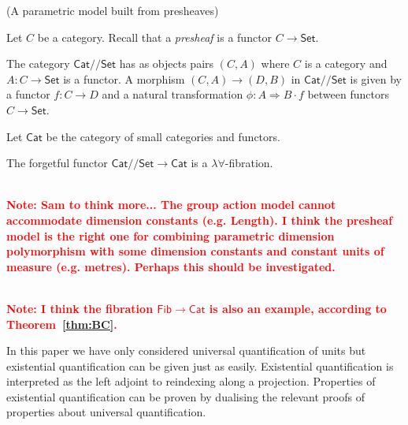 \documentclass[a4paper,UKenglish]{lipics}
\newcommand\note[1]{{ \bf \textcolor{red} {\vspace{2mm}\; \\ Note: #1\\}}}
\newcommand{\ra}{\rightarrow}
\newcommand{\msf}[1]{\mathsf{#1}} %
\newcommand{\Set}{\msf{Set}}
\newcommand{\Cat}{\msf{Cat}}
\newcommand{\Fib}{\msf{Fib}}
\newcommand{\LAb}{\msf{L}_{\msf{Ab}}}
\newcommand{\terminal}{\msf{1}}
\newcommand{\E}{\mathcal{E}}
\newcommand{\fibreE}[1]{\E_{_{#1}}}
\newcommand{\GroupSet}[1]{#1/\!/\Set}
\newcommand{\CatSet}{\GroupSet{\Cat}}
\newcommand{\qnt}{\msf{quantity}}
\begin{document}
\begin{example}(A parametric model built from presheaves)

Let $C$ be a category. Recall that a \emph{presheaf} is a
functor $C\to\Set$.

The category $\CatSet$ has as objects pairs $(C,A)$ where $C$ is a
category and $A:C\to\Set$ is a functor. A morphism $(C,A) \rightarrow
(D,B)$ in $\CatSet$ is given by a functor $f:C\rightarrow D$
and a natural transformation $\phi:A \Rightarrow B\cdot f$ between functors
$C\to\Set$.


Let $\Cat$ be the category of small categories and functors.

The forgetful functor $\CatSet\to \Cat$ is a $\lambda\forall$-fibration.


\note{Sam to think more... The group action model cannot accommodate dimension constants (e.g. Length). I think the presheaf model is the right one for combining parametric dimension polymorphism with
some dimension constants and constant units of measure (e.g. metres).
Perhaps this should be investigated.}

\end{example}
\note{I think the fibration $\Fib\to\Cat$ is also an example,
according to Theorem~\ref{thm:BC}. }



\begin{remark}
In this paper we have only considered universal quantification of units but existential quantification can be given just as easily. Existential quantification is interpreted as the left adjoint to reindexing along a projection. Properties of  existential quantification can be proven by dualising the relevant proofs of properties about universal quantification.
\end{remark}
\end{document}
